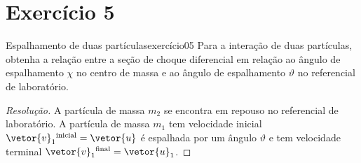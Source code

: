 \section*{Exercício 5}
\begin{exercício}{Espalhamento de duas partículas}{exercício05}
    Para a interação de duas partículas, obtenha a relação entre a seção de choque diferencial em relação ao ângulo de espalhamento \(\chi\) no centro de massa e ao ângulo de espalhamento \(\vartheta\) no referencial de laboratório.
\end{exercício}
\begin{proof}[Resolução]
    A partícula de massa \(m_2\) se encontra em repouso no referencial de laboratório. A partícula de massa \(m_1\) tem velocidade inicial \(\vetor{v}_1\textsuperscript{inicial} = \vetor{u}\) é espalhada por um ângulo \(\vartheta\) e tem velocidade terminal \(\vetor{v}_1\textsuperscript{final}=\vetor{u}_1\). %


\end{proof}
